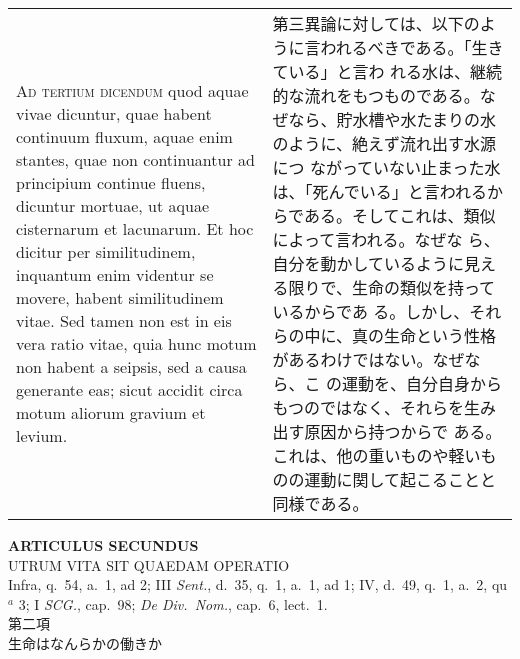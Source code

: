 \documentclass[10pt]{jsarticle} %
\begin{document}
\begin{longtable}{p{21em}p{21em}}
{\scshape Ad tertium dicendum} quod aquae vivae dicuntur, quae habent
 continuum fluxum, aquae enim stantes, quae non continuantur ad
 principium continue fluens, dicuntur mortuae, ut aquae cisternarum et
 lacunarum. Et hoc dicitur per similitudinem, inquantum enim videntur se
 movere, habent similitudinem vitae. Sed tamen non est in eis vera ratio
 vitae, quia hunc motum non habent a seipsis, sed a causa generante eas;
 sicut accidit circa motum aliorum gravium et levium.
 
&

第三異論に対しては、以下のように言われるべきである。「生きている」と言わ
れる水は、継続的な流れをもつものである。なぜなら、貯水槽や水たまりの水のように、絶えず流れ出す水源につ
ながっていない止まった水は、「死んでいる」と言われるからである。そしてこれは、類似によって言われる。なぜな
ら、自分を動かしているように見える限りで、生命の類似を持っているからであ
る。しかし、それらの中に、真の生命という性格があるわけではない。なぜなら、こ
の運動を、自分自身からもつのではなく、それらを生み出す原因から持つからで
ある。これは、他の重いものや軽いものの運動に関して起こることと同様である。




\end{longtable}
\newpage


\begin{center}
 {\Large {\bf ARTICULUS SECUNDUS}}\\
 {\large UTRUM VITA SIT QUAEDAM OPERATIO}\\
 {\footnotesize Infra, q.~54, a.~1, ad 2; III {\itshape Sent.}, d.~35,
 q.~1, a.~1, ad 1; IV, d.~49, q.~1, a.~2, qu$^a$ 3; I {\itshape SCG.},
 cap.~98; {\itshape De Div.~Nom.}, cap.~6, lect.~1.}\\
 {\Large 第二項\\生命はなんらかの働きか}
\end{center}
\end{document}
